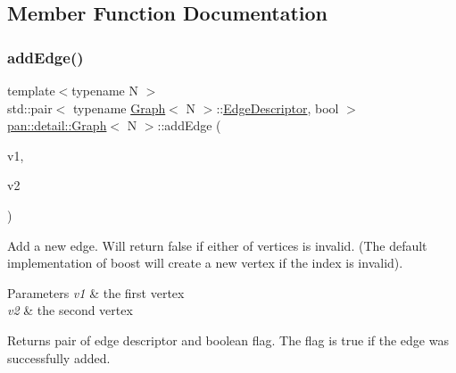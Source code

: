 \subsection{Member Function Documentation}
\mbox{\label{classpan_1_1detail_1_1_graph_a581e01f695352af2a25dd2547f586c51}} 
\subsubsection{\texorpdfstring{add\+Edge()}{addEdge()}}
{\footnotesize\ttfamily template$<$typename N $>$ \\
std\+::pair$<$ typename \hyperlink{classpan_1_1detail_1_1_graph}{Graph}$<$ N $>$\+::\hyperlink{classpan_1_1detail_1_1_graph_a21d6fe3d33512e98e8578df1f4d8b810}{Edge\+Descriptor}, bool $>$ \hyperlink{classpan_1_1detail_1_1_graph}{pan\+::detail\+::\+Graph}$<$ N $>$\+::add\+Edge (\begin{DoxyParamCaption}\item[{\hyperlink{classpan_1_1detail_1_1_graph_a462f566d2f6cb0e51c85c8e9fa5382ab}{Vertex\+Descriptor}}]{v1,  }\item[{\hyperlink{classpan_1_1detail_1_1_graph_a462f566d2f6cb0e51c85c8e9fa5382ab}{Vertex\+Descriptor}}]{v2 }\end{DoxyParamCaption})\hspace{0.3cm}{\ttfamily [inline]}}

Add a new edge. Will return false if either of vertices is invalid. (The default implementation of boost will create a new vertex if the index is invalid). 
\begin{DoxyParams}{Parameters}
{\em v1} & the first vertex \\
\hline
{\em v2} & the second vertex \\
\hline
\end{DoxyParams}
\begin{DoxyReturn}{Returns}
pair of edge descriptor and boolean flag. The flag is true if the edge was successfully added. 
\end{DoxyReturn}
\mbox{\label{classpan_1_1detail_1_1_graph_a3848d9e9acbfeff14634de5cc0395614}} 
